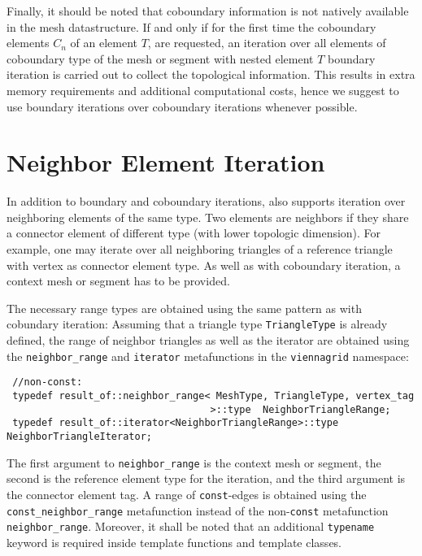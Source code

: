 Finally, it should be noted that coboundary information is not natively available in the mesh datastructure.
If and only if for the first time the coboundary elements $C_n$ of an element $T$, are requested, an iteration over all elements of coboundary type of the mesh or segment with nested element $T$ boundary iteration is carried out to collect the topological information.
This results in extra memory requirements and additional computational costs, hence we suggest to use boundary iterations over coboundary iterations whenever possible.



\section{Neighbor Element Iteration}
In addition to boundary and coboundary iterations, {\ViennaGridversion} also supports iteration over neighboring elements of the same type.
Two elements are neighbors if they share a connector element of different type (with lower topologic dimension).
For example, one may iterate over all neighboring triangles of a reference triangle with vertex as connector element type.
As well as with coboundary iteration, a context mesh or segment has to be provided.


The necessary range types are obtained using the same pattern as with cobundary iteration:
Assuming that a triangle type \lstinline|TriangleType| is already defined, the range of neighbor triangles as well as the iterator are obtained
using the \lstinline|neighbor_range| and \lstinline|iterator| metafunctions in the \lstinline|viennagrid| namespace:
\begin{lstlisting}
 //non-const:
 typedef result_of::neighbor_range< MeshType, TriangleType, vertex_tag
                                   >::type  NeighborTriangleRange;
 typedef result_of::iterator<NeighborTriangleRange>::type   NeighborTriangleIterator;
\end{lstlisting}
The first argument to \lstinline|neighbor_range| is the context mesh or segment, the second is the reference element type for the iteration, and the third argument is the connector element tag.
A range of \lstinline|const|-edges is obtained using the \lstinline|const_neighbor_range| metafunction instead of the non-\lstinline|const| metafunction \lstinline|neighbor_range|.
Moreover, it shall be noted that an additional \lstinline|typename| keyword is required inside template functions and template classes.

